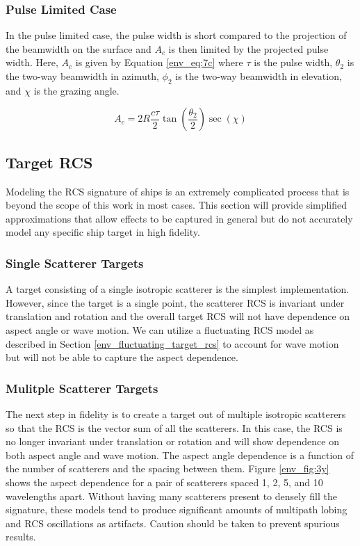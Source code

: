\subsubsection{Pulse Limited Case}
In the pulse limited case, the pulse width is short compared to the projection of the beamwidth on the surface and $A_c$ is then limited by the projected pulse width. Here, $A_c$ is given by Equation \ref{env_eq:7c} where $\tau$ is the pulse width, $\theta_2$ is the two-way beamwidth in azimuth, $\phi_2$ is the two-way beamwidth in elevation, and $\chi$ is the grazing angle.

\begin{equation}
\label{env_eq:7c}
A_c = 2R\frac{c\tau}{2}\tan\left(\frac{\theta_2}{2}\right)\sec(\chi)
\end{equation}
\renewcommand{\baselinestretch}{2} \small\normalsize

\subsection{Target RCS}
Modeling the RCS signature of ships is an extremely complicated process that is beyond the scope of this work in most cases. This section will provide simplified approximations that allow effects to be captured in general but do not accurately model any specific ship target in high fidelity.

\subsubsection{Single Scatterer Targets}
A target consisting of a single isotropic scatterer is the simplest implementation. However, since the target is a single point, the scatterer RCS is invariant under translation and rotation and the overall target RCS will not have dependence on aspect angle or wave motion. We can utilize a fluctuating RCS model as described in Section \ref{env_fluctuating_target_rcs} to account for wave motion but will not be able to capture the aspect dependence.

\subsubsection{Mulitple Scatterer Targets}
The next step in fidelity is to create a target out of multiple isotropic scatterers so that the RCS is the vector sum of all the scatterers. In this case, the RCS is no longer invariant under translation or rotation and will show dependence on both aspect angle and wave motion. The aspect angle dependence is a function of the number of scatterers and the spacing between them. Figure \ref{env_fig:3y} shows the aspect dependence for a pair of scatterers spaced 1, 2, 5, and 10 wavelengths apart. Without having many scatterers present to densely fill the signature, these models tend to produce significant amounts of multipath lobing and RCS oscillations as artifacts. Caution should be taken to prevent spurious results.

